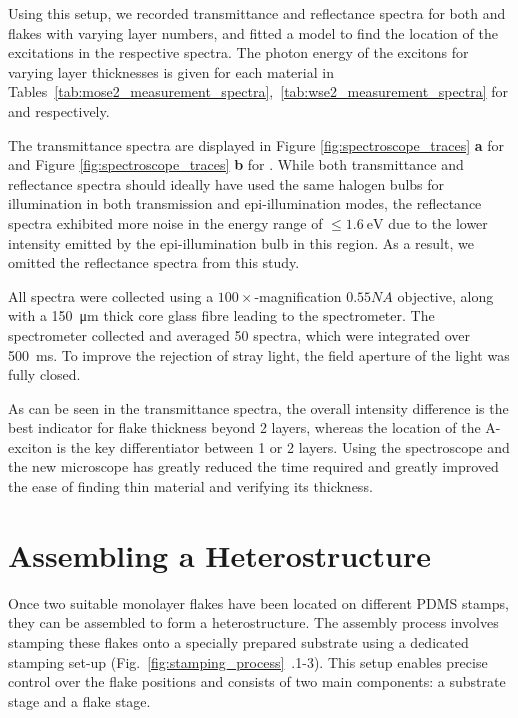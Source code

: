 \vspace{1cm}

Using this setup, we recorded transmittance and reflectance spectra for both  and  flakes with varying layer numbers, and fitted a model to find the location of the excitations in the respective spectra. The photon energy of the excitons for varying layer thicknesses is given for each material in Tables~\ref{tab:mose2_measurement_spectra},~\ref{tab:wse2_measurement_spectra} for  and  respectively.



The transmittance spectra are displayed in Figure \ref{fig:spectroscope_traces} \textbf{a} for  and Figure \ref{fig:spectroscope_traces} \textbf{b} for . 
%
While both transmittance and reflectance spectra should ideally have used the same halogen bulbs for illumination in both transmission and epi-illumination modes, the reflectance spectra exhibited more noise in the energy range of $\leq \SI{1.6}{\electronvolt}$ due to the lower intensity emitted by the epi-illumination bulb in this region. As a result, we omitted the reflectance spectra from this study.

All spectra were collected using a $100\times$-magnification $0.55NA$ objective, along with a \SI{150}{\micro\meter} thick core glass fibre leading to the spectrometer. 
%
The spectrometer collected and averaged 50 spectra, which were integrated over \SI{500}{\milli\second}. To improve the rejection of stray light, the field aperture of the light was fully closed.

As can be seen in the transmittance spectra, the overall intensity difference is the best indicator for flake thickness beyond 2 layers, whereas the location of the A-exciton is the key differentiator between 1 or 2 layers. 
%
Using the spectroscope and the new microscope has greatly reduced the time required and greatly improved the ease of finding thin material and verifying its thickness.

\section{Assembling a Heterostructure}
%
Once two suitable monolayer flakes have been located on different PDMS stamps, they can be assembled to form a heterostructure.
%
The assembly process involves stamping these flakes onto a specially prepared substrate using a dedicated stamping set-up (Fig.~\ref{fig:stamping_process}~.1-3).
%
This setup enables precise control over the flake positions and consists of two main components: a substrate stage and a flake stage.

